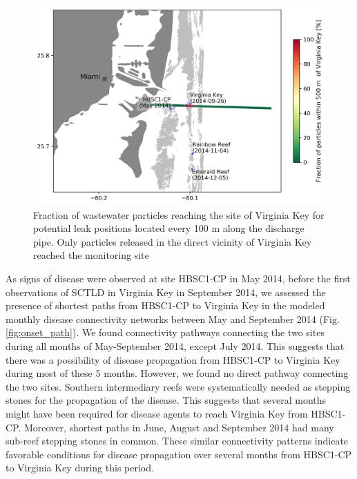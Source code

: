 \documentclass[preprint,12pt,authoryear]{elsarticle}
\begin{document}
\begin{figure}
    \centering
    \includegraphics[width=.7\textwidth]{figures/pipeline.png}
    \caption{Fraction of wastewater particles reaching the site of Virginia Key for potential leak positions located every 100 m along the discharge pipe. Only particles released in the direct vicinity of Virginia Key reached the monitoring site}
    \label{fig:onset_pipe}
\end{figure}

As signs of disease were observed at site HBSC1-CP in May 2014, before the first observations of SCTLD in Virginia Key in September 2014, we assessed the presence of shortest paths from HBSC1-CP to Virginia Key in the modeled monthly disease connectivity networks between May and September 2014 (Fig. \ref{fig:onset_path}). We found connectivity pathways connecting the two sites during all months of May-September 2014, except July 2014. This suggests that there was a possibility of disease propagation from HBSC1-CP to Virginia Key during most of these 5 months. However, we found no direct pathway connecting the two sites. Southern intermediary reefs were systematically needed as stepping stones for the propagation of the disease. This suggests that several months might have been required for disease agents to reach Virginia Key from HBSC1-CP. Moreover, shortest paths in June, August and September 2014 had many sub-reef stepping stones in common. These similar connectivity patterns indicate favorable conditions for disease propagation over several months from HBSC1-CP to Virginia Key during this period.  
\end{document}
